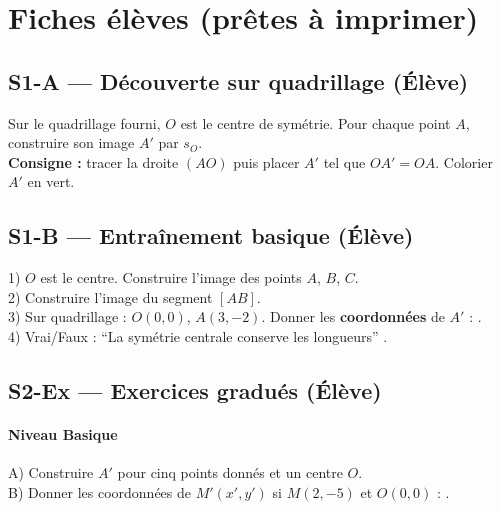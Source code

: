 \newpage
\section*{Fiches élèves (prêtes à imprimer)}

\subsection*{S1-A — Découverte sur quadrillage (Élève)}
\begin{exercice}
	Sur le quadrillage fourni, $O$ est le centre de symétrie. Pour chaque point $A$, construire son image $A'$ par $s_O$.\\
	\textbf{Consigne :} tracer la droite $(AO)$ puis placer $A'$ tel que $OA'=OA$. Colorier $A'$ en vert.
\end{exercice}

\subsection*{S1-B — Entraînement basique (Élève)}
\begin{exercice}
	1) $O$ est le centre. Construire l'image des points $A$, $B$, $C$. \\
	2) Construire l'image du segment $[AB]$. \\
	3) Sur quadrillage : $O(0,0)$, $A(3,-2)$. Donner les \textbf{coordonnées} de $A'$ : \trous{2cm}. \\
	4) Vrai/Faux : ``La symétrie centrale conserve les longueurs'' \trous{1.2cm}.
\end{exercice}

\subsection*{S2-Ex — Exercices gradués (Élève)}
\paragraph{Niveau Basique}
\begin{exercice}
	A) Construire $A'$ pour cinq points donnés et un centre $O$.\\
	B) Donner les coordonnées de $M'(x',y')$ si $M(2,{-}5)$ et $O(0,0)$ : \trous{2cm}.
\end{exercice}

